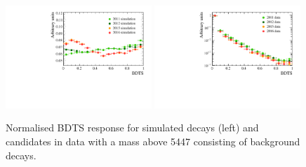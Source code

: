\begin{figure}[htbp]
    \centering
        \includegraphics[width=0.49\textwidth]{./Figs/Selection/BDTS_signal_Feb6.pdf}
       \includegraphics[width=0.49\textwidth]{./Figs/Selection/BDTS_background_Feb6.pdf}
    \caption{Normalised BDTS response for simulated \bsmumu decays (left) and \bmumu candidates in data with a mass above 5447 \mevcc consisting of background decays.}
    \label{fig:FlatteningBDTS}
\end{figure}

